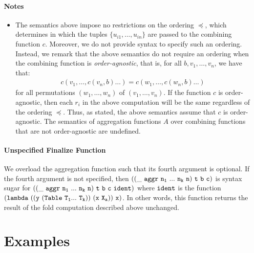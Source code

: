\documentclass[english,a4paper,10pt]{article}
\begin{document}
\paragraph{Notes}
\begin{itemize}
\item
The semantics above impose no restrictions on the ordering $\preceq$,
which determines in which the tuples $\{ u_{i1}, \ldots, u_{in} \}$
are passed to the combining function $c$.
Moreover, 
we do not provide syntax to specify such an ordering.
Instead, 
we remark that the above semantics
do not require an ordering when the combining function is
\emph{order-agnostic},
that is, for all $b, v_1, \ldots, v_n$,
we have that:
\begin{align*}
c( v_1, \ldots, c( v_n, b ) \ldots ) = 
c( w_1, \ldots, c( w_n, b ) \ldots )
\end{align*}
for all permutations $( w_1, \ldots, w_n )$ of $( v_1, \ldots, v_n )$.
If the function $c$ is order-agnostic,
then each $r_i$ in the above computation will be the same regardless
of the ordering $\preceq$.
Thus, as stated, the above semantics assume that $c$ is order-agnostic.
The semantics
of aggregation functions $A$ over
combining functions that are not order-agnostic are undefined.
\end{itemize}

\paragraph{Unspecified Finalize Function}
We overload the aggregation function
such that its fourth argument is optional.
If the fourth argument is not specified,
then 
$
{\tt 
((\_\ aggr\ n_1\ ...\ n_k\ n)\ t\ b\ c)
}
$
is syntax sugar for
$
{\tt 
((\_\ aggr\ n_1\ ...\ n_k\ n)\ t\ b\ c\ ident)
}
$
where ${\tt ident}$ is the function
${\tt (lambda\ ((y\ (Table\ T_1 ...\ T_k))\ (x\ X_a))\ x)}$.
In other words, this function returns the result of the
fold computation described above unchanged.

\section{Examples}
\end{document}
